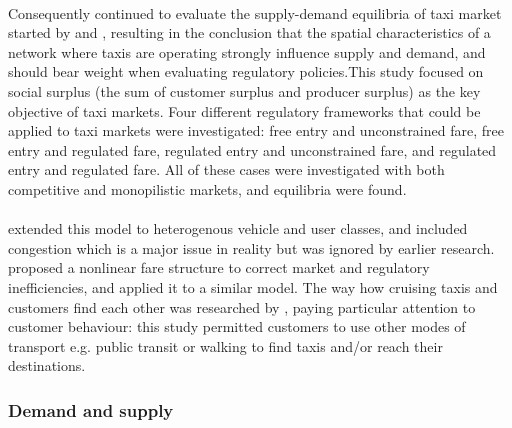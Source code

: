 \paragraph{}Consequently \textcite{Yang2002taxi+demand} continued to evaluate
the supply-demand equilibria of taxi market started by
\textcite{Yang1998taxi+network} and \textcite{Yang2000taxi+utilization},
resulting in the conclusion that the spatial characteristics of a network where
taxis are operating strongly influence supply and demand, and should bear
weight when evaluating regulatory policies.This study focused on social surplus
(the sum of customer surplus and producer surplus) as the key objective of taxi
markets. Four different regulatory frameworks that could be applied to taxi
markets were investigated: free entry and unconstrained fare, free entry and
regulated fare, regulated entry and unconstrained fare, and regulated entry and
regulated fare. All of these cases were investigated with both competitive and
monopilistic markets, and equilibria were found.

\paragraph{}\textcite{Wong2008taxi+modeling} extended this model to
heterogenous vehicle and user classes, and included congestion which is a major
issue in reality but was ignored by earlier research.
\textcite{Yang2010taxi+nonlinear} proposed a nonlinear fare structure to
correct market and regulatory inefficiencies, and applied it to a similar
model. The way how cruising taxis and customers find each other was researched
by \textcite{Yang2010taxi+equilibria}, paying particular attention to customer
behaviour: this study permitted customers to use other modes of transport e.g.
public transit or walking to find taxis and/or reach their destinations.

\subsubsection{Demand and supply}

